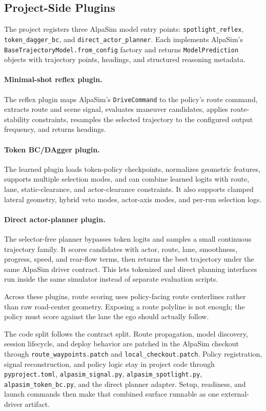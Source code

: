 \documentclass{article}
\begin{document}
\subsection{Project-Side Plugins}

The project registers three AlpaSim model entry points:
\texttt{spotlight\_reflex}, \texttt{token\_dagger\_bc}, and
\texttt{direct\_actor\_planner}. Each implements AlpaSim's
\texttt{BaseTrajectoryModel.from\_config} factory and returns
\texttt{ModelPrediction} objects with trajectory points, headings, and structured
reasoning metadata.

\paragraph{Minimal-shot reflex plugin.}
The reflex plugin maps AlpaSim's \texttt{DriveCommand} to the policy's route command,
extracts route and scene signal, evaluates maneuver candidates, applies route-stability
constraints, resamples the selected trajectory to the configured output frequency, and
returns headings.

\paragraph{Token BC/DAgger plugin.}
The learned plugin loads token-policy checkpoints, normalizes geometric features,
supports multiple selection modes, and can combine learned logits with route, lane,
static-clearance, and actor-clearance constraints. It also supports clamped lateral
geometry, hybrid veto modes, actor-axis modes, and per-run selection logs.

\paragraph{Direct actor-planner plugin.}
The selector-free planner bypasses token logits and samples a small continuous trajectory
family. It scores candidates with actor, route, lane, smoothness, progress, speed, and
rear-flow terms, then returns the best trajectory under the same AlpaSim driver contract.
This lets tokenized and direct planning interfaces run inside the same simulator instead
of separate evaluation scripts.

Across these plugins, route scoring uses policy-facing route centerlines rather than raw
road-center geometry. Exposing a route polyline is not enough; the policy must score
against the lane the ego should actually follow.

The code split follows the contract split. Route propagation, model discovery, session
lifecycle, and deploy behavior are patched in the AlpaSim checkout through
\texttt{route\_waypoints.patch} and \texttt{local\_checkout.patch}. Policy registration,
signal reconstruction, and policy logic stay in project code through
\texttt{pyproject.toml}, \texttt{alpasim\_signal.py}, \texttt{alpasim\_spotlight.py},
\texttt{alpasim\_token\_bc.py}, and the direct planner adapter. Setup, readiness, and
launch commands then make that combined surface runnable as one external-driver artifact.
\end{document}
